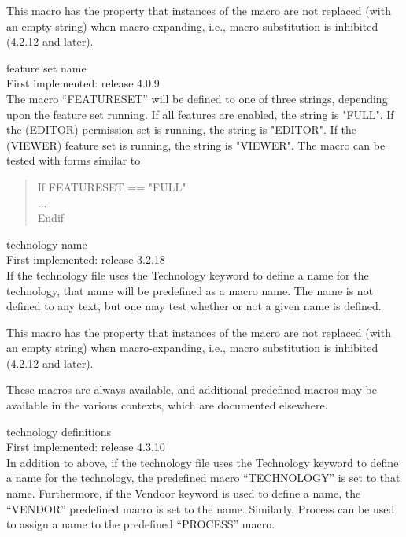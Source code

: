 \begin{description}
This macro has the property that instances of the macro are not
replaced (with an empty string) when macro-expanding, i.e., macro
substitution is inhibited (4.2.12 and later).
 
\item{feature set name}\\
First implemented:  release 4.0.9\\
The macro ``{\vt FEATURESET}'' will be defined to one of three
strings, depending upon the feature set running.  If all features are
enabled, the string is {\vt "FULL"}.  If the {\XicII} (EDITOR)
permission set is running, the string is {\vt "EDITOR"}.  If the
{\Xiv} (VIEWER) feature set is running, the string is {\vt "VIEWER"}. 
The macro can be tested with forms similar to
\begin{quote}\vt
If FEATURESET == "FULL"\\
...\\
Endif
\end{quote}

\item{technology name}\\
First implemented: release 3.2.18\\
If the technology file uses the {\vt Technology} keyword to define a
name for the technology, that name will be predefined as a macro
name.  The name is not defined to any text, but one may test whether
or not a given name is defined.

This macro has the property that instances of the macro are not
replaced (with an empty string) when macro-expanding, i.e., macro
substitution is inhibited (4.2.12 and later).
\end{description}

These macros are always available, and additional predefined macros
may be available in the various contexts, which are documented
elsewhere.

\begin{description}
\item{technology definitions}\\
First implemented: release 4.3.10\\
In addition to above, if the technology file uses the {\vt Technology}
keyword to define a name for the technology, the predefined macro
``{\vt TECHNOLOGY}'' is set to that name.  Furthermore, if the {\vt
Vendoor} keyword is used to define a name, the ``{\vt VENDOR}''
predefined macro is set to the name.  Similarly, {\vt Process} can be
used to assign a name to the predefined ``{\vt PROCESS}'' macro.
\end{description}

